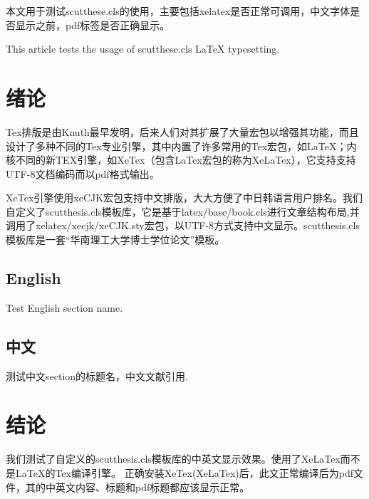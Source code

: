 \documentclass[unicode,pdfcover]{scutthesis}
\begin{document}
\maketitle

\frontmatter

\begin{abstractCN}
本文用于测试scutthese.cls的使用，主要包括xelatex是否正常可调用，中文字体是否显示之前，pdf标签是否正确显示。
\end{abstractCN}

\begin{abstractEN}
This article tests the usage of scutthese.cls \LaTeX{} typesetting.
\end{abstractEN}


\tableofcontents{}
 
\mainmatter

\chapter{绪论}
Tex排版\cite{knuth1986thetexbook}是由Knuth最早发明，后来人们对其扩展了大量宏包以增强其功能，而且设计了多种不同的Tex专业引擎，其中内置了许多常用的Tex宏包，如\LaTeX{}\cite{goossens1994thelatex}；内核不同的新TEX引擎，如XeTex（包含LaTex宏包的称为XeLaTex），它支持支持UTF-8文档编码而以pdf格式输出。

XeTex引擎使用xeCJK宏包支持中文排版，大大方便了中日韩语言用户排名。我们自定义了scutthesis.cls模板库，它是基于latex/base/book.cls进行文章结构布局,并调用了xelatex/xecjk/xeCJK.sty宏包，以UTF-8方式支持中文显示。scutthesis.cls模板库是一套“华南理工大学博士学位论文”模板。

\section{English}
Test English section name.

\section{中文}
测试中文section的标题名，中文文献引用\cite{cnproceed, wang_model_2009}.


\chapter{结论}
我们测试了自定义的scutthesis.cls模板库的中英文显示效果。使用了XeLaTex而不是\LaTeX{}的Tex编译引擎。
正确安装XeTex(XeLaTex)后，此文正常编译后为pdf文件，其的中英文内容、标题和pdf标题都应该显示正常。
\end{document}
